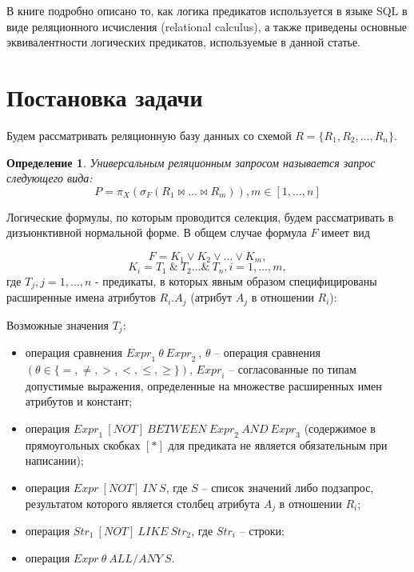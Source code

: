 \documentclass{cmi}
\newtheorem{mydef}{Определение}
\def \n #1{\mathit{#1}}
\begin{document}
В книге \cite{date} подробно описано то, как логика предикатов используется в языке SQL в виде
реляционного исчисления (relational calculus), а также приведены основные эквивалентности логических
предикатов, используемые в данной статье.

\section{Постановка задачи}
\label{sec-problem}
Будем рассматривать реляционную базу данных со схемой $R = \{R_1, R_2, \dots, R_n\}$.

\begin{mydef}
	Универсальным реляционным запросом называется запрос следующего вида:
	$$P = \pi_X(\sigma_{F} (R_1 \Join \dots \Join R_m )), m \in [1, \dots, n]$$
\end{mydef}

Логические формулы, по которым проводится селекция, будем рассматривать в дизъюнктивной нормальной форме. В общем случае формула $F$ имеет вид

\begin{equation}
F = K_1 \vee K_2 \vee \dots \vee K_m ,
\label{def_F_1}
\end{equation}
\begin{equation}
K_i = T_1\ \&\ T_2 \dots \&\ T_n, i = 1, \dots, m ,
\label{def_F_2}
\end{equation}
где $T_j, j = 1, \dots, n$ - предикаты, в которых явным образом
специфицированы расширенные имена атрибутов $R_i.A_j$ (атрибут $A_j$ в отношении
$R_i$):

Возможные значения  $T_j$:
\begin{itemize}
	\item операция сравнения $ \n{Expr}_1\ \theta\ \n{Expr}_2\ $, $\theta$ – операция
	сравнения $(\theta \in \{=, \neq, >, <, \leq, \geq\})$, $\n{Expr}_i$ –
	согласованные по типам допустимые выражения, определенные на множестве
	расширенных имен атрибутов и констант;
	\item операция $\n{Expr}_1\ \n{[NOT]}\ \n{BETWEEN}\ \n{Expr}_2\ \n{AND}\
	\n{Expr}_3$ (содержимое в прямоугольных скобках $[*]$ для предиката не
	является обязательным при написании);
	\item операция $\n{Expr}\ \n{[NOT]}\ \n{IN}\ S$, где $S$ – список значений либо
	подзапрос, результатом которого является столбец атрибута $A_j$ в отношении
	$R_i$;
	\item операция $\n{Str}_1\ \n{[NOT]}\ \n{LIKE}\ \n{Str}_2$, где $\n{Str}_i$ –
	строки;
	\item операция $\n{Expr}\ \theta\ \n{ALL/ANY}\ S$.
\end{itemize}
\end{document}
